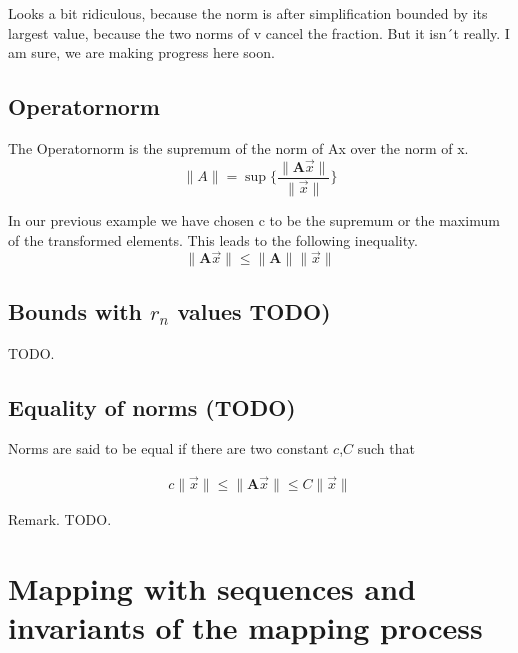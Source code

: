 \documentclass[a4paper]{article}
\begin{document}
Looks a bit ridiculous, because the norm is after simplification bounded by its largest value, because the two norms of v cancel the fraction. But it isn´t really. I am sure, we are making progress here soon.\\

\subsection{Operatornorm}

The Operatornorm is the supremum of the norm of Ax over the norm of x.\\

\begin{displaymath}
\|A\| = \sup\{ \frac{\|\boldsymbol{A}\vec{x}\|}{\|\vec{x}\|} \}
\end{displaymath}

In our previous example we have chosen c to be the supremum or the maximum of the transformed elements.
This leads to the following inequality.\\

\begin{displaymath}
\|\boldsymbol{A}\vec{x}\| \leq \|\boldsymbol{A}\|\|\vec{x}\|
\end{displaymath}


\subsection{Bounds with $r_n$ values TODO)}

TODO.

\subsection{Equality of norms (TODO)}

Norms are said to be equal if there are two constant $c$,$C$ such that

\begin{displaymath}
\begin{align}
    c\|\vec{x}\| \leq \|\boldsymbol{A}\vec{x}\| \leq C\|\vec{x}\|
\end{align}
\end{displaymath}

Remark. TODO.


\section{Mapping with sequences and invariants of the mapping process}
\end{document}
